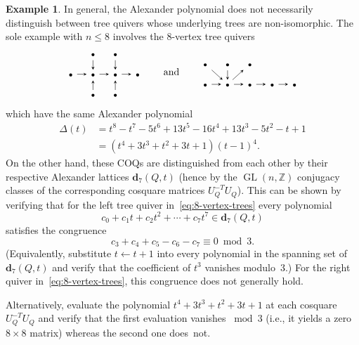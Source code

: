 \documentclass[11pt, letterpaper]{amsart}
\newcommand{\hide}[1]{}
\theoremstyle{definition}
\newtheorem{example}[theorem]{Example}
\numberwithin{equation}{section}
\def\ZZ{{\mathbb Z}}
\def\dd{{\mathbf{d}}}
\def\GL{{\operatorname{GL}}}
\begin{document}
\begin{example}
\label{eg:8vert-trees}
In general, the Alexander polynomial does not necessarily distinguish between 
tree quivers whose underlying trees are non-isomorphic.
The sole example with $n\le8$ involves the 8-vertex tree quivers
\begin{equation}
\label{eq:8-vertex-trees}
\begin{tikzcd}[arrows={-stealth}, sep=1em]
& \scriptstyle\bullet \arrow[d] & \scriptstyle\bullet \arrow[d]\\
  \scriptstyle\bullet  \arrow[r]   & \scriptstyle\bullet  \arrow[r] & \scriptstyle\bullet \arrow[r] & \scriptstyle\bullet \\
 & \scriptstyle\bullet  \arrow[u] &  \scriptstyle\bullet \arrow[u]
   & 
\end{tikzcd}
\qquad  \text{and}\qquad 
\begin{tikzcd}[arrows={-stealth}, sep=1em]
\scriptstyle\bullet \arrow[dr] & \scriptstyle\bullet \arrow[d] & \scriptstyle\bullet \\
  \scriptstyle\bullet  \arrow[r]   & \scriptstyle\bullet  \arrow[r] \arrow[ru] & \scriptstyle\bullet \arrow[r]   & \scriptstyle\bullet \arrow[r]   & \scriptstyle\bullet 
\end{tikzcd}
\end{equation}
which have the same Alexander polynomial
\begin{align*}
\Delta(t)&=
t^8 - t^7 - 5t^6 + 13t^5 - 16t^4 + 13t^3 - 5t^2 - t + 1 \\
&=(t^4 + 3t^3 + t^2 + 3t + 1)(t - 1)^4. 
\end{align*}
On the other hand, these COQs are distinguished from each other by their respective Alexander lattices
$\dd_7(Q,t)$ (hence by the $\GL(n,\ZZ)$ conjugacy classes
of the corresponding cosquare matrices $U_Q^{-T}U_Q$). 
This can be shown by verifying that for the left tree quiver in~\eqref{eq:8-vertex-trees}
every polynomial
\begin{equation*}
c_0+c_1 t + c_2 t^2 +\cdots+ c_7 t^7 \in \dd_7(Q,t)
\end{equation*}
satisfies the congruence
\begin{equation*}
c_3+c_4+c_5-c_6-c_7\equiv 0 \bmod 3.  
\end{equation*}
(Equivalently, substitute $t\leftarrow t+1$ into every polynomial in the spanning set of $\dd_7(Q,t)$
and verify that the coefficient of $t^3$ vanishes modulo~3.)
For the right quiver in~\eqref{eq:8-vertex-trees}, this congruence does not generally hold. 

\hide{
This can be shown by computing the lattice $d_7$.
Both lattices have rank $5$. 
For the tree on the left, when projected onto $1, t, \ldots, t^4$ the lattice $d_7$ has determinant $3$.
For the tree on the right, when projected onto the same subspace the corresponding lattice has determinant $1$ (indeed, we get all integer polynomials of degree $\leq 4$). 
} %
Alternatively, evaluate the polynomial
$t^4 + 3t^3 + t^2 + 3t + 1$ at each cosquare $U_Q^{-T}U_Q$
and verify that the first evaluation vanishes $\bmod 3$ 
(i.e., it yields a zero $8\times 8$ matrix) 
whereas the second one does~not.
\end{example}
\end{document}

